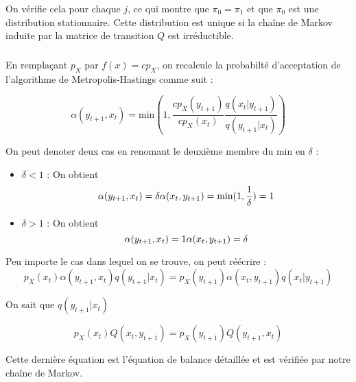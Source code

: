 On vérifie cela pour chaque $j$, ce qui montre que $\pi_0 = \pi_1$ et que $\pi_0$ est une distribution stationnaire. Cette distribution est unique si la chaîne de Markov induite par la matrice de transition $Q$ est irréductible. 

\subsubsection{}
En remplaçant $p_X$ par $f(x) = cp_X$, on recalcule la probabilté d'acceptation de l'algorithme de Metropolis-Hastings comme suit :

\begin{equation*}
  \alpha(y_{t+1},x_t) = \text{min}(1,\frac{cp_X(y_{t+1})}{cp_X(x_t)}\frac{q(x_t|y_{t+1})}{q(y_{t+1}|x_t)})
\end{equation*}

On peut denoter deux cas en renomant le deuxième membre du min en $\delta$ : 

\begin{itemize}
  \item $\delta < 1$ : On obtient 
  \begin{equation*}
    \alpha(y_{t+1},x_t) = \delta\\
    \alpha(x_t,y_{t+1}) = \text{min}(1,\frac{1}{\delta}) = 1
  \end{equation*}
  \item $\delta > 1$ : On obtient
  \begin{equation*}
    \alpha(y_{t+1},x_t) = 1\\
    \alpha(x_t,y_{t+1}) = \delta
  \end{equation*}
\end{itemize}

Peu importe le cas dans lequel on se trouve, on peut réécrire :
\begin{equation*}
  p_X(x_t)\alpha(y_{t+1},x_t)q(y_{t+1}|x_t) = p_X(y_{t+1})\alpha(x_t,y_{t+1})q(x_t|y_{t+1})
\end{equation*}

On sait que $q(y_{t+1}|x_t)$ 

\begin{equation*}
  p_X(x_t)Q(x_t,y_{t+1}) = p_X(y_{t+1})Q(y_{t+1},x_t)
\end{equation*}

Cette dernière équation est l'équation de balance détaillée et est vérifiée par notre chaîne de Markov.